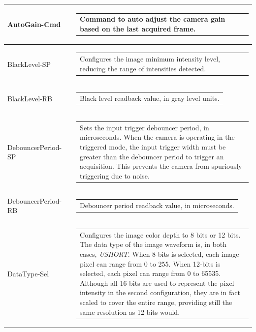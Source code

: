 \documentclass[openany]{article}
\begin{document}
\begin{longtable}{| m{3.0cm} m{4.5cm} m{7.0cm} |}
        AutoGain-Cmd &  & \begin{tabular}{@{}m{6cm}@{}}
                Command to auto adjust the camera gain based on the last acquired frame.
            \end{tabular} \hypertarget{pv:black-level}{}\\ \hline
        BlackLevel-SP &  & \begin{tabular}{@{}m{6cm}@{}}
                Configures the image minimum intensity level, reducing the
                range of intensities detected.
            \end{tabular} \\ \hline
        BlackLevel-RB &  & \begin{tabular}{@{}m{6cm}@{}}
                Black level readback value, in gray level units.
            \end{tabular} \hypertarget{pv:debouncer-period}{}\\ \hline
        DebouncerPeriod-SP &  & \begin{tabular}{@{}m{6cm}@{}}
                Sets the input trigger debouncer period, in microseconds.
                When the camera is operating in the triggered mode, the input trigger 
                width must be greater than the debouncer period to trigger an acquisition.
                This prevents the camera from spuriously triggering due to noise.
            \end{tabular} \\ \hline
        DebouncerPeriod-RB &  & \begin{tabular}{@{}m{6cm}@{}}
                Debouncer period readback value, in microseconds.
            \end{tabular} \hypertarget{pv:data-type}{}\\ \hline
        DataType-Sel &  & \begin{tabular}{@{}m{6cm}@{}}
                Configures the image color depth to 8 bits or 12 bits. The data type of
                the image waveform is, in both cases, \emph{USHORT}. When 8-bits is 
                selected, each image pixel can range from 0 to 255. When 12-bits is
                selected, each pixel can range from 0 to 65535. Although all 16 bits
                are used to represent the pixel intensity in the second configuration,
                they are in fact scaled to cover the entire range, providing still the
                same resolution as 12 bits would.  

\end{tabular}
\end{longtable}
\end{document}
